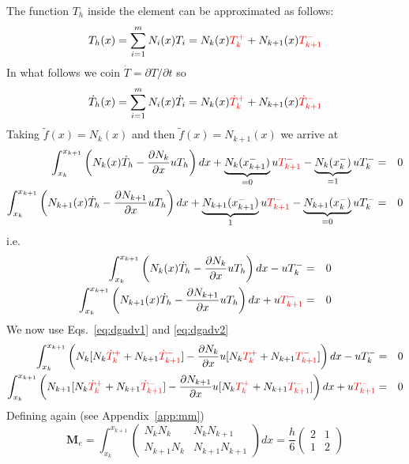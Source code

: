 The function $T_h$ inside the element can be approximated 
as follows:
\begin{equation}
T_h(x) = \sum_{i=1}^m N_i(x) T_i = 
N_k(x) {\color{red}T_k^+} + N_{k+1}(x) {\color{red}T_{k+1}^-}
\label{eq:dgadv1} 
\end{equation}
In what follows we coin $\dot{T}=\partial T/\partial t$ so
\begin{equation}
\dot{T}_h(x) 
= \sum_{i=1}^m N_i(x) \dot{T}_i 
= N_k(x) {\color{red}\dot{T}_k^+} + N_{k+1}(x) {\color{red}\dot{T}_{k+1}^-}
\label{eq:dgadv2} 
\end{equation}
Taking $\tilde{f}(x)=N_k(x)$ and then $\tilde{f}(x)=N_{k+1}(x)$ we arrive at
\begin{eqnarray}
\int_{x_k}^{x_{k+1}}\left(
N_k(x) \dot{T}_h -
\frac{\partial N_k}{\partial x} uT_h \right) dx
+\underbrace{N_k(x_{k+1}^-)}_{=0}u {\color{red}T_{k+1}^-}     - \underbrace{N_k (x_{k}^-)}_{=1}uT_{k}^- &=& 0 \\
\int_{x_k}^{x_{k+1}}\left(
N_{k+1}(x) \dot{T}_h -
\frac{\partial N_{k+1}}{\partial x} uT_h \right) dx
+ \underbrace{N_{k+1}(x_{k+1}^-)}_{1}u {\color{red}T_{k+1}^-}     -\underbrace{N_{k+1}(x_{k}^-)}_{=0}uT_{k}^- &=& 0
\end{eqnarray}
i.e.
\begin{eqnarray}
\int_{x_k}^{x_{k+1}}\left(
N_k(x) \dot{T}_h -
\frac{\partial N_k}{\partial x} uT_h \right) dx
   -  uT_{k}^- &=& 0 \\
\int_{x_k}^{x_{k+1}}\left(
N_{k+1}(x)  \dot{T}_h -
\frac{\partial N_{k+1}}{\partial x} uT_h \right) dx
+ u{\color{red} T_{k+1}^-}      &=& 0
\end{eqnarray}
We now use Eqs.~\eqref{eq:dgadv1} and \eqref{eq:dgadv2}
\begin{eqnarray}
\int_{x_k}^{x_{k+1}}\left(
N_k
[N_k {\color{red}\dot{T}_k^+} + N_{k+1} {\color{red}\dot{T}_{k+1}^-}]
-
\frac{\partial N_k}{\partial x} u
[N_k {\color{red}T_k^+} + N_{k+1} {\color{red}T_{k+1}^-}]
 \right) dx
   -  uT_{k}^- &=& 0 \\
\int_{x_k}^{x_{k+1}}\left(
N_{k+1} 
[N_k {\color{red}\dot{T}_k^+} + N_{k+1} {\color{red}\dot{T}_{k+1}^-}]
 -
\frac{\partial N_{k+1}}{\partial x} u
[N_k {\color{red}T_k^+} + N_{k+1} {\color{red}T_{k+1}^-}]
\right) dx
+ u{\color{red} T_{k+1}^-}      &=& 0
\end{eqnarray}
Defining again (see Appendix~\ref{app:mm})
\[
{\bm M}_e=
\int_{x_k}^{x_{k+1}}
\left(
\begin{array}{cc}
N_kN_k & N_k N_{k+1} \\
N_{k+1}N_k & N_{k+1} N_{k+1} 
\end{array}
\right)
dx
= 
\frac{h}{6}
\left(
\begin{array}{cc}
2  & 1 \\
1 & 2
\end{array}
\right)
\]
